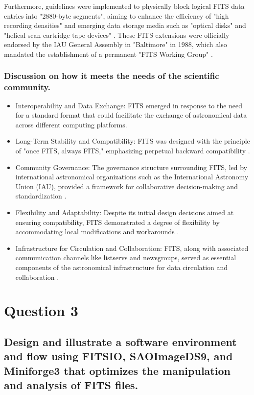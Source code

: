 \documentclass[a4paper,oneside,11pt]{book}
\begin{document}
Furthermore, guidelines were implemented to physically block logical FITS data entries into "2880-byte segments", aiming to enhance the efficiency of "high recording densities" and emerging data storage media such as "optical disks" and "helical scan cartridge tape devices" \citep{grosbol1991fits}. These FITS extensions were officially endorsed by the IAU General Assembly in "Baltimore" in 1988, which also mandated the establishment of a permanent "FITS Working Group" \citep{grosbol1991fits}.
\subsection{Discussion on how it meets the needs of the scientific community.}
\begin{itemize}
    \item Interoperability and Data Exchange: FITS emerged in response to the need for a standard format that could facilitate the exchange of astronomical data across different computing platforms.
    \item Long-Term Stability and Compatibility: FITS was designed with the principle of "once FITS, always FITS," emphasizing perpetual backward compatibility \citep{scroggins2020once}. 
    \item Community Governance: The governance structure surrounding FITS, led by international astronomical organizations such as the International Astronomy Union (IAU), provided a framework for collaborative decision-making and standardization \citep{scroggins2020once}.
    \item Flexibility and Adaptability: Despite its initial design decisions aimed at ensuring compatibility, FITS demonstrated a degree of flexibility by accommodating local modifications and workarounds \citep{greisen2002representations}. 
    \item Infrastructure for Circulation and Collaboration: FITS, along with associated communication channels like listservs and newsgroups, served as essential components of the astronomical infrastructure for data circulation and collaboration \citep{scroggins2020once}.
\end{itemize}
\chapter{Question 3}
\section{Design and illustrate a software environment and flow using FITSIO, SAOImageDS9, and Miniforge3 that optimizes the manipulation and analysis of FITS files.}
\end{document}
